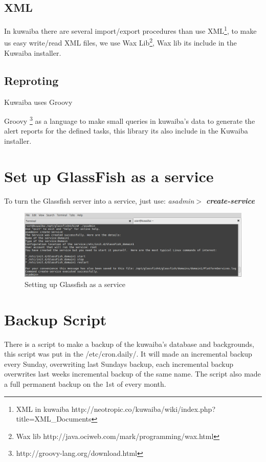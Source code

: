\documentclass[a4paper]{article}
\begin{document}
	    \subsection{XML}
		    In kuwaiba there are several import/export procedures than use XML\footnote{XML in kuwaiba http://neotropic.co/kuwaiba/wiki/index.php?title=XML\_Documents}, to make us easy write/read XML files, we use Wax Lib\footnote{Wax lib http://java.ociweb.com/mark/programming/wax.html}, Wax lib its include in the Kuwaiba installer.
		    
	    \subsection{Reproting}
		    Kuwaiba uses Groovy{Groovy \footnote{http://groovy-lang.org/download.html} as a language to make small queries in kuwaiba's data to generate the alert reports for the defined tasks, this library its also include in the Kuwaiba installer.
		
	\section{Set up GlassFish as a service}\label{sec:glassfish_as_service}
		To turn the Glassfish server into a service, just use:
		\textit{asadmin$>$ \textbf{create-service}}
		\begin{figure}[h!]
			\centering
			\includegraphics[width=1\linewidth]{img/glassfish_as_service_result.png}
			\caption{Setting up Glassfish as a service}
			\label{fig:glassfish_as_service_resultans}
		\end{figure}

	\section{Backup Script} \label{sec:backup_script}
		There is a script to make a backup of the kuwaiba's database and backgrounds, this script was put in the /etc/cron.daily/. It will made an incremental backup every Sunday, overwriting last Sundays backup, each incremental backup overwrites last weeks incremental backup of the same name. The script also made a full permanent backup on the 1st of every month.
	
}
\end{document}
